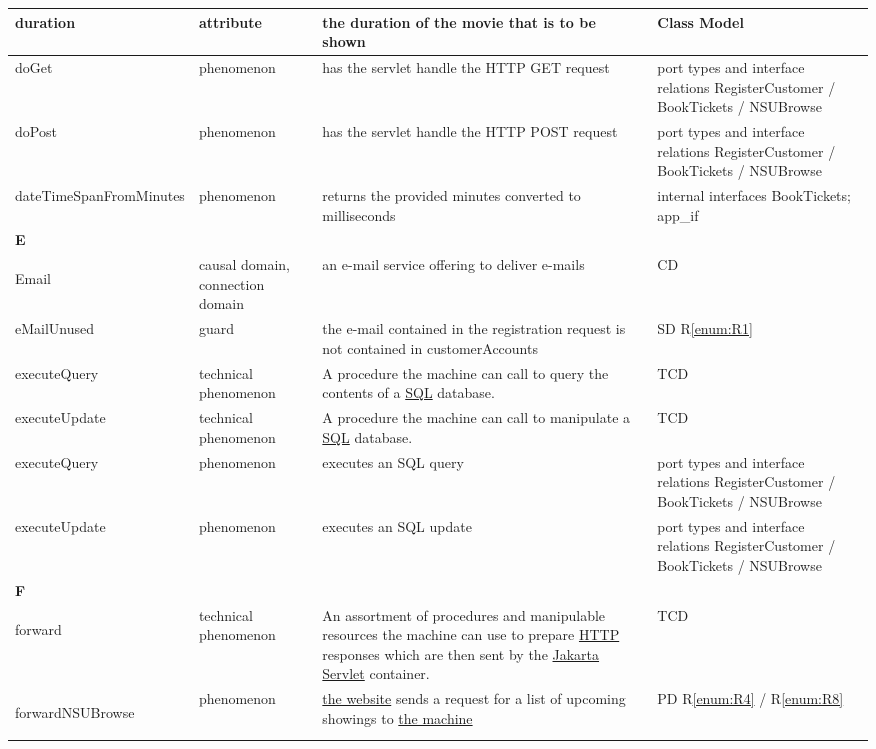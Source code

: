 \documentclass[a4paper,10pt,titlepage,bibtotoc,bibtotocnumbered]{scrreprt}
\begin{document}
\begin{longtable}{|p{.4\linewidth}|p{.2\linewidth}|p{.2\linewidth}|p{.2\linewidth}|}
\hline
duration & attribute & the duration of the movie that is to be shown & Class Model\\
\hline
doGet & phenomenon & has the servlet handle the HTTP GET request & port types and interface relations RegisterCustomer / BookTickets / NSUBrowse\\
\hline
doPost & phenomenon & has the servlet handle the HTTP POST request & port types and interface relations RegisterCustomer / BookTickets / NSUBrowse\\
\hline
dateTimeSpanFromMinutes & phenomenon & returns the provided minutes converted to milliseconds & internal interfaces BookTickets; app\_if\\
\hline
\multicolumn{4}{|l|}{\textbf{E}}\\
\hline
\hypertarget{glossary:Email}{Email} & causal domain, connection domain & an e-mail service offering to deliver e-mails & CD\\
\hline
eMailUnused & guard & the e-mail contained in the registration request is not contained in customerAccounts & SD R\ref{enum:R1}\\
\hline
executeQuery & technical phenomenon & A procedure the machine can call to query the contents of a \href{https://www.mysql.com/products/enterprise/techspec.html}{SQL} database. & TCD\\
\hline
executeUpdate & technical phenomenon & A procedure the machine can call to manipulate a \href{https://www.mysql.com/products/enterprise/techspec.html}{SQL} database. & TCD\\
\hline
executeQuery & phenomenon & executes an SQL query & port types and interface relations RegisterCustomer / BookTickets / NSUBrowse\\
\hline
executeUpdate & phenomenon & executes an SQL update & port types and interface relations RegisterCustomer / BookTickets / NSUBrowse\\
\hline
\multicolumn{4}{|l|}{\textbf{F}}\\
\hline
\hypertarget{glossary:forward}{forward} & technical phenomenon & An assortment of procedures and manipulable resources the machine can use to prepare \href{https://datatracker.ietf.org/doc/html/rfc9112}{HTTP} responses which are then sent by the \href{https://jakarta.ee/specifications/servlet/}{Jakarta Servlet} container. & TCD\\
\hline
\hypertarget{glossary:forwardNSUBrowse}{forwardNSUBrowse} & phenomenon & \hyperlink{glossary:WebPageNonStaffUserBrowse}{the website} sends a request for a list of upcoming showings to \hyperlink{glossary:UDEK-NonStaffUserBrowse}{the machine} & PD R\ref{enum:R4} / R\ref{enum:R8}\\

\end{longtable}
\end{document}
